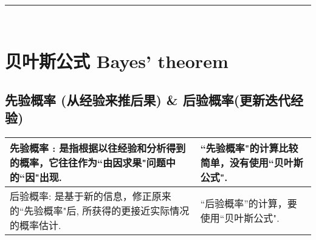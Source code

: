 \documentclass[UTF8]{ctexart}
\begin{document}
~\\
\hrule
~\\



\section{贝叶斯公式 Bayes' theorem}

\subsection{先验概率 (从经验来推后果) \& 后验概率(更新迭代经验)}

\begin{tabular}{|p{}|p{}|}
	\hline
先验概率 :	是指根据以往经验和分析得到的概率，它往往作为``由因求果"问题中的``因"出现.  
&   
``先验概率"的计算比较简单，没有使用``贝叶斯公式". \\
	\hline
后验概率: 是基于新的信息，修正原来的``先验概率"后, 所获得的更接近实际情况的概率估计.	
& ``后验概率''的计算，要使用``贝叶斯公式".
	  \\
	\hline
\end{tabular}
























	
	
	
\end{document}
